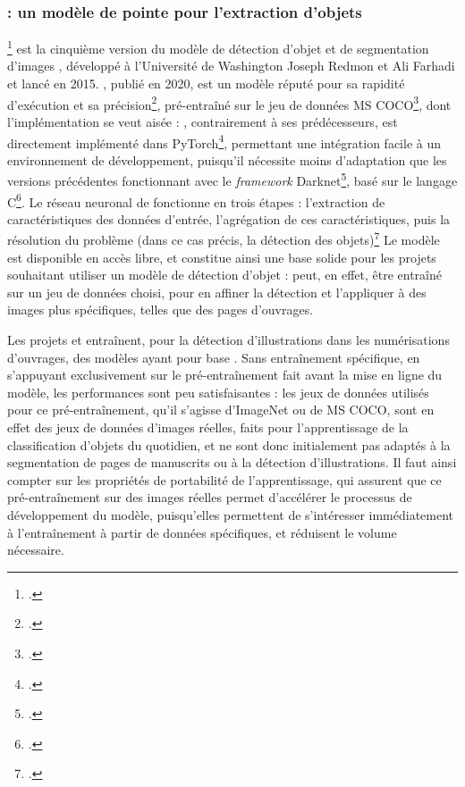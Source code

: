     \subsubsection{\yolov : un modèle de pointe pour l'extraction d'objets}
	\yolov\footcite{ultralyticsUltralyticsYOLOv8Docs} est la cinquième version du modèle de détection d'objet et de segmentation d'images \yolo, développé à l'Université de Washington Joseph Redmon et Ali Farhadi et lancé en 2015. \yolov, publié en 2020, est un modèle réputé pour sa rapidité d'exécution et sa précision\footcite{buttnerCorDeepSacroboscoDataset2022}, pré-entraîné sur le jeu de données MS COCO\footcite{COCOCommonObjects}, dont l'implémentation se veut aisée : \yolov, contrairement à ses prédécesseurs, est directement implémenté dans PyTorch\footcite{PyTorch}, permettant une intégration facile à un environnement de développement, puisqu'il nécessite moins d'adaptation que les versions précédentes fonctionnant avec le \textit{framework} Darknet\footcite{DarknetOpenSource}, basé sur le langage C\footcite{sharmaTrainingYOLOv5Object2022}. Le réseau neuronal de \yolo fonctionne en trois étapes : l'extraction de caractéristiques des données d'entrée, l'agrégation de ces caractéristiques, puis la résolution du problème (dans ce cas précis, la détection des objets)\footcite{buttnerCorDeepSacroboscoDataset2022} Le modèle est disponible en accès libre, et constitue ainsi une base solide pour les projets souhaitant utiliser un modèle de détection d'objet : \yolov peut, en effet, être entraîné sur un jeu de données choisi, pour en affiner la détection et l'appliquer à des images plus spécifiques, telles que des pages d'ouvrages.
	
	Les projets \eida et \vhs entraînent, pour la détection d'illustrations dans les numérisations d'ouvrages, des modèles ayant pour base \yolov. Sans entraînement spécifique, en s'appuyant exclusivement sur le pré-entraînement fait avant la mise en ligne du modèle, les performances sont peu satisfaisantes : les jeux de données utilisés pour ce pré-entraînement, qu'il s'agisse d'ImageNet ou de MS COCO, sont en effet des jeux de données d'images réelles, faits pour l'apprentissage de la classification d'objets du quotidien, et ne sont donc initialement pas adaptés à la segmentation de pages de manuscrits ou à la détection d'illustrations. Il faut ainsi compter sur les propriétés de portabilité de l'apprentissage, qui assurent que ce pré-entraînement sur des images réelles permet d'accélérer le processus de développement du modèle, puisqu'elles permettent de s'intéresser immédiatement à l'entraînement à partir de données spécifiques, et réduisent le volume nécessaire. 
	
